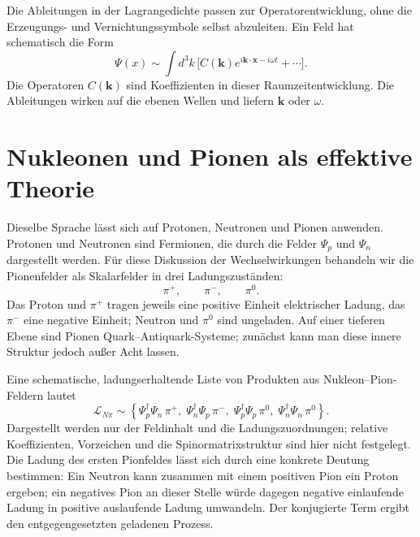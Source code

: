 Die Ableitungen in der Lagrangedichte passen zur Operatorentwicklung, ohne die Erzeugungs- und Vernichtungssymbole selbst abzuleiten. Ein Feld hat schematisch die Form
\begin{equation}
\Psi(x)
\sim
\int d^3k\,
\bigl[
C(\mathbf k)e^{i\mathbf k\cdot\mathbf x-i\omega t}
+\cdots
\bigr].
\end{equation}
Die Operatoren \(C(\mathbf k)\) sind Koeffizienten in dieser Raumzeitentwicklung. Die Ableitungen wirken auf die ebenen Wellen und liefern \(\mathbf k\) oder \(\omega\).

\begin{classroomqa}
\end{classroomqa}

\section{Nukleonen und Pionen als effektive Theorie}

Dieselbe Sprache lässt sich auf Protonen, Neutronen und Pionen anwenden. Protonen und Neutronen sind Fermionen, die durch die Felder \(\Psi_p\) und \(\Psi_n\) dargestellt werden. Für diese Diskussion der Wechselwirkungen behandeln wir die Pionenfelder als Skalarfelder in drei Ladungszuständen:
\begin{equation}
\pi^+,
\qquad
\pi^-,
\qquad
\pi^0.
\end{equation}
Das Proton und \(\pi^+\) tragen jeweils eine positive Einheit elektrischer Ladung, das \(\pi^-\) eine negative Einheit; Neutron und \(\pi^0\) sind ungeladen. Auf einer tieferen Ebene sind Pionen Quark--Antiquark-Systeme; zunächst kann man diese innere Struktur jedoch außer Acht lassen.

Eine schematische, ladungserhaltende Liste von Produkten aus Nukleon--Pion-Feldern lautet
\begin{equation}
\mathcal L_{N\pi}
\sim
\left\{
\Psi_p^\dagger\Psi_n\,\pi^+,\;
\Psi_n^\dagger\Psi_p\,\pi^-,\;
\Psi_p^\dagger\Psi_p\,\pi^0,\;
\Psi_n^\dagger\Psi_n\,\pi^0
\right\}.
\end{equation}
Dargestellt werden nur der Feldinhalt und die Ladungszuordnungen; relative Koeffizienten, Vorzeichen und die Spinormatrixstruktur sind hier nicht festgelegt. Die Ladung des ersten Pionfeldes lässt sich durch eine konkrete Deutung bestimmen: Ein Neutron kann zusammen mit einem positiven Pion ein Proton ergeben; ein negatives Pion an dieser Stelle würde dagegen negative einlaufende Ladung in positive auslaufende Ladung umwandeln. Der konjugierte Term ergibt den entgegengesetzten geladenen Prozess.

